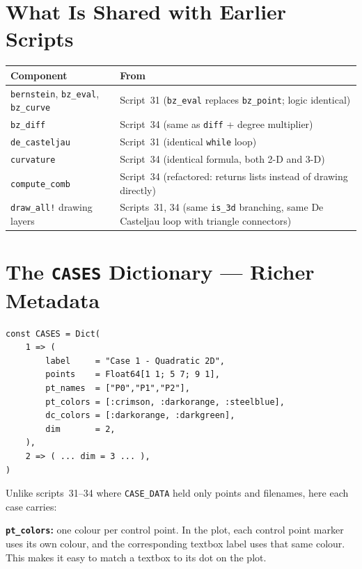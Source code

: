 \documentclass[12pt, a4paper]{article}
\newcommand{\cd}[1]{\texttt{#1}}
\begin{document}
\section{What Is Shared with Earlier Scripts}

\begin{samebox}
\begin{tabular}{lp{9cm}}
\toprule
Component & From \\
\midrule
\cd{bernstein}, \cd{bz\_eval}, \cd{bz\_curve} &
  Script~31 (\cd{bz\_eval} replaces \cd{bz\_point};
  logic identical) \\
\cd{bz\_diff} &
  Script~34 (same as \cd{diff} + degree multiplier) \\
\cd{de\_casteljau} &
  Script~31 (identical \cd{while} loop) \\
\cd{curvature} &
  Script~34 (identical formula, both 2-D and 3-D) \\
\cd{compute\_comb} &
  Script~34 (refactored: returns lists instead of
  drawing directly) \\
\cd{draw\_all!} drawing layers &
  Scripts~31, 34 (same \cd{is\_3d} branching,
  same De Casteljau loop with triangle connectors) \\
\bottomrule
\end{tabular}
\end{samebox}


\section{The \texttt{CASES} Dictionary --- Richer Metadata}

\begin{verbatim}
const CASES = Dict(
    1 => (
        label     = "Case 1 - Quadratic 2D",
        points    = Float64[1 1; 5 7; 9 1],
        pt_names  = ["P0","P1","P2"],
        pt_colors = [:crimson, :darkorange, :steelblue],
        dc_colors = [:darkorange, :darkgreen],
        dim       = 2,
    ),
    2 => ( ... dim = 3 ... ),
)
\end{verbatim}

Unlike scripts~31--34 where \cd{CASE\_DATA} held only
points and filenames, here each case carries:

\textbf{\cd{pt\_colors}:} one colour per control point.
In the plot, each control point marker uses its own colour,
and the corresponding textbox label uses that same colour.
This makes it easy to match a textbox to its dot on the plot.
\end{document}
